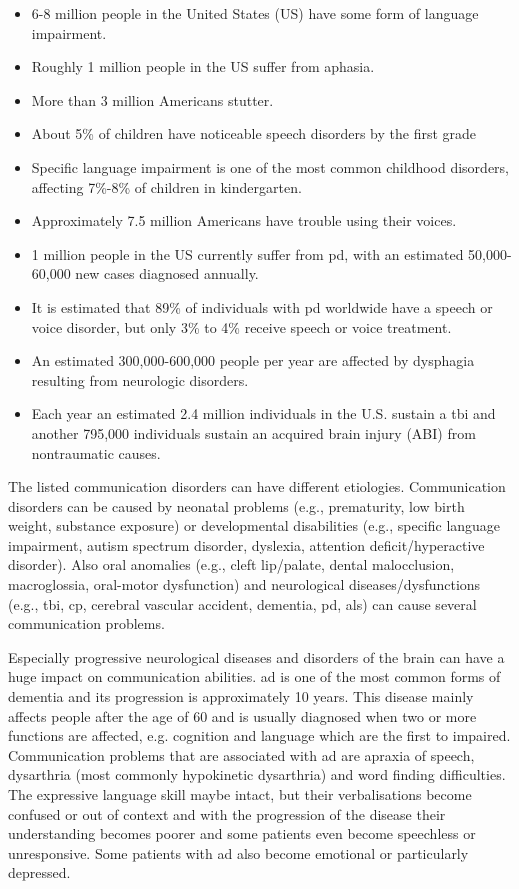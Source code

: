 \begin{itemize}
\item 6-8 million people in the United States (US) have some form of language impairment.
\item Roughly 1 million people in the US suffer from aphasia. 
\item More than 3 million Americans stutter. 
\item About 5\% of children have noticeable speech disorders by the first grade 
\item Specific language impairment is one of the most common childhood disorders, affecting 7\%-8\% of children in kindergarten. 
\item Approximately 7.5 million Americans have trouble using their voices.
\item 1 million people in the US currently suffer from \gls{pd}, with an estimated 50,000-60,000 new cases diagnosed annually. 
\item It is estimated that 89\% of individuals with \gls{pd} worldwide have a speech or voice disorder, but only 3\% to 4\% receive speech or voice treatment. 
\item An estimated 300,000-600,000 people per year are affected by \gls{dysphagia} resulting from neurologic disorders. 
\item Each year an estimated 2.4 million individuals in the U.S. sustain a \gls{tbi} and another 795,000 individuals sustain an acquired brain injury (ABI) from nontraumatic causes.
\end{itemize}

The listed communication disorders can have different etiologies. Communication disorders can be caused by neonatal problems (e.g., prematurity, low birth weight, substance exposure) or developmental disabilities (e.g., specific language impairment, autism spectrum disorder, dyslexia, attention deficit/hyperactive disorder). Also oral anomalies (e.g., cleft lip/palate, dental malocclusion, macroglossia, oral-motor dysfunction) and neurological diseases/dysfunctions (e.g., \gls{tbi}, \gls{cp}, cerebral vascular accident, dementia, \gls{pd}, \gls{als}) can cause several communication problems.

Especially progressive neurological diseases and disorders of the brain can have a huge impact on communication abilities. \gls{ad} is one of the most common forms of dementia and its progression is approximately 10 years. This disease mainly affects people after the age of 60 and is usually diagnosed when two or more functions are affected, e.g. cognition and language which are the first to impaired. Communication problems that are associated with \gls{ad} are \gls{apraxia} of speech, \gls{dysarthria} (most commonly hypokinetic dysarthria)  and word finding difficulties. The expressive language skill maybe intact, but their verbalisations become confused or out of context and with the progression of the disease their understanding becomes poorer and some patients even become speechless or unresponsive. Some patients with \gls{ad} also become emotional or particularly depressed. \cite{communicationDifficulties} 
 
